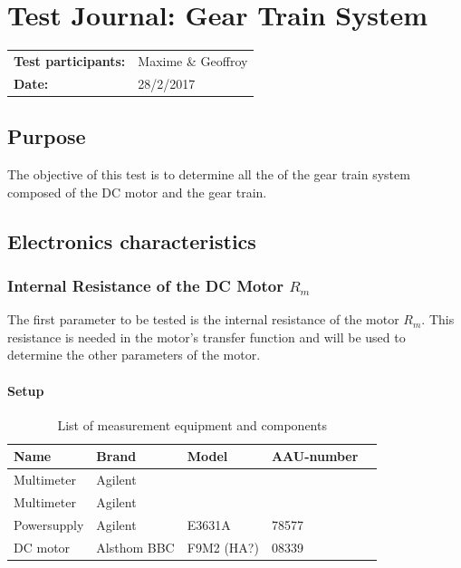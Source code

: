 \graphicspath{{figures/appendix/}}
\chapter{Test Journal: Gear Train System}\label{appendix:DCMotorInductance}
\begin{table}[htbp]
\begin{tabular}{l l}
\textbf{Test participants:} & Maxime \& Geoffroy  \\
\textbf{Date:}  & 28/2/2017
\end{tabular}
\end{table}

\section*{Purpose}
The objective of this test is to determine all the of the gear train system composed of the DC motor and the gear train.
\section*{Electronics characteristics}
\subsection{Internal Resistance of the DC Motor $R_m$}
The first parameter to be tested is the internal resistance of the motor $R_m$. This resistance is needed in the motor's transfer function and will be used to determine the other parameters of the motor. 
\subsubsection*{Setup}
\begin{table}[htbp]
	\centering
	\caption{List of measurement equipment and components}\label{tab_appendix:LaSetUp}

	\begin{tabularx}{\textwidth}{lXXXX}
		Name 				& Brand	& Model & AAU-number									\\ \toprule \rowcolor{lightGrey}
		Multimeter	& Agilent &  & 	\\
		Multimeter	& Agilent &  &  	\\ \rowcolor{lightGrey}
		Powersupply	& Agilent & E3631A & 78577\\
		DC motor & Alsthom BBC & F9M2 (HA?)& 08339 
	\end{tabularx}
\end{table}

